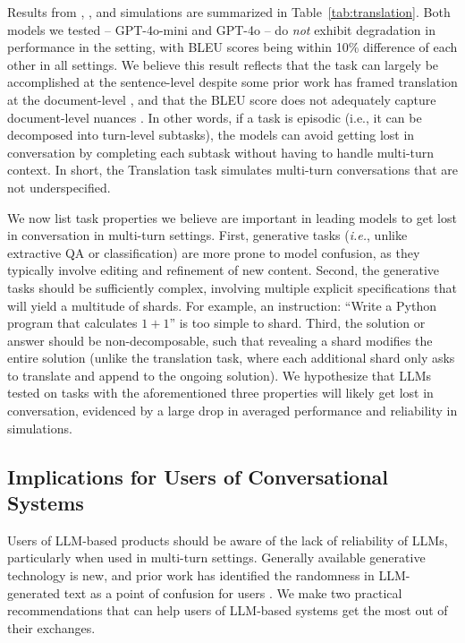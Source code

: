 \documentclass{article}
\begin{document}
Results from \fullt, \concatt, and \shardedt simulations are summarized in Table~\ref{tab:translation}. Both models we tested -- GPT-4o-mini and GPT-4o -- do \textit{not} exhibit degradation in performance in the \shardedt setting, with BLEU scores being within 10\% difference of each other in all settings. We believe this result reflects that the task can largely be accomplished at the sentence-level despite some prior work has framed translation at the document-level \cite{post2023escaping}, and that the BLEU score does not adequately capture document-level nuances \cite{ma2021comparison}.
In other words, if a task is episodic (i.e., it can be decomposed into turn-level subtasks), the models can avoid getting lost in conversation by completing each subtask without having to handle multi-turn context. In short, the \shardedt Translation task simulates multi-turn conversations that are not underspecified.

We now list task properties we believe are important in leading models to get lost in conversation in multi-turn settings. First, generative tasks (\textit{i.e.}, unlike extractive QA or classification) are more prone to model confusion, as they typically involve editing and refinement of new content. Second, the generative tasks should be sufficiently complex, involving multiple explicit specifications that will yield a multitude of shards. For example, an instruction: ``Write a Python program that calculates $1+1$'' is too simple to shard. Third, the solution or answer should be non-decomposable, such that revealing a shard modifies the entire solution (unlike the translation task, where each additional shard only asks to translate and append to the ongoing solution). We hypothesize that LLMs tested on tasks with the aforementioned three properties will likely get lost in conversation, evidenced by a large drop in averaged performance and reliability in \shardedt simulations.

\subsection{Implications for Users of Conversational Systems} \label{sec:implications_users}

Users of LLM-based products should be aware of the lack of reliability of LLMs, particularly when used in multi-turn settings. Generally available generative technology is new, and prior work has identified the randomness in LLM-generated text as a point of confusion for users \cite{Mylrea2023ArtificialI,Weisz2024DesignPF,venkit2024search,Lee2024OneVM}. We make two practical recommendations that can help users of LLM-based systems get the most out of their exchanges.
\end{document}
